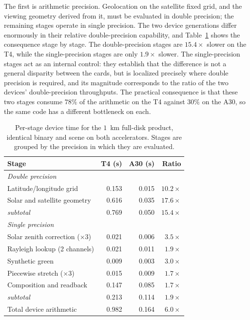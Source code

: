 \documentclass{ametsocV6.1}
\begin{document}
The first is arithmetic precision. Geolocation on the satellite fixed grid, and
the viewing geometry derived from it, must be evaluated in double precision;
the remaining stages operate in single precision. The two device generations
differ enormously in their relative double-precision capability, and
Table~\ref{tab:stages} shows the consequence stage by stage. The
double-precision stages are $15.4\times$ slower on the T4, while the
single-precision stages are only $1.9\times$ slower. The single-precision
stages act as an internal control: they establish that the difference is not a
general disparity between the cards, but is localized precisely where double
precision is required, and its magnitude corresponds to the ratio of the two
devices' double-precision throughputs. The practical consequence is that these
two stages consume $78\%$ of the arithmetic on the T4 against $30\%$ on the
A30, so the same code has a different bottleneck on each.

\begin{table}[t]
\caption{Per-stage device time for the $1$~km full-disk product, identical
binary and scene on both accelerators. Stages are grouped by the precision in
which they are evaluated.}\label{tab:stages}
\centering
\begin{tabular}{lrrr}
\toprule
Stage & T4 (s) & A30 (s) & Ratio \\
\midrule
\multicolumn{4}{l}{\textit{Double precision}} \\
\quad Latitude/longitude grid       & 0.153 & 0.015 & $10.2\times$ \\
\quad Solar and satellite geometry  & 0.616 & 0.035 & $17.6\times$ \\
\quad \textit{subtotal}             & 0.769 & 0.050 & $15.4\times$ \\
\midrule
\multicolumn{4}{l}{\textit{Single precision}} \\
\quad Solar zenith correction ($\times 3$) & 0.021 & 0.006 & $3.5\times$ \\
\quad Rayleigh lookup (2 channels)  & 0.021 & 0.011 & $1.9\times$ \\
\quad Synthetic green               & 0.009 & 0.003 & $3.0\times$ \\
\quad Piecewise stretch ($\times 3$) & 0.015 & 0.009 & $1.7\times$ \\
\quad Composition and readback      & 0.147 & 0.085 & $1.7\times$ \\
\quad \textit{subtotal}             & 0.213 & 0.114 & $1.9\times$ \\
\midrule
Total device arithmetic             & 0.982 & 0.164 & $6.0\times$ \\
\bottomrule
\end{tabular}
\end{table}
\end{document}
